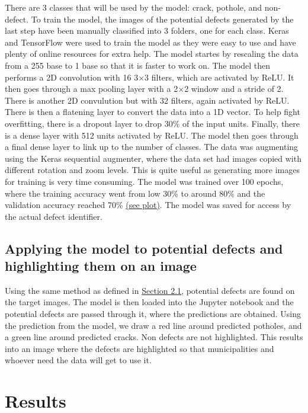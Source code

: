 \documentclass[12pt, letterpaper, twoside]{article}
\begin{document}
There are 3 classes that will be used by the model: crack, pothole, and non-defect. 
To train the model, the images of the potential defects generated by the last step have been manually classified into 3 folders, one for each class.
Keras and TensorFlow were used to train the model as they were easy to use and have plenty of online resources for extra help.
The model startes by rescaling the data from a 255 base to 1 base so that it is faster to work on.
The model then performs a 2D convolution with 16 3$\times$3 filters, which are activated by ReLU\@.
It then goes through a max pooling layer with a 2$\times$2 window and a stride of 2.
There is another 2D convulution but with 32 filters, again activated by ReLU\@.
There is then a flatening layer to convert the data into a 1D vector.
To help fight overfitting, there is a dropout layer to drop 30\% of the input units.
Finally, there is a dense layer with 512 units activated by ReLU\@.
The model then goes through a final dense layer to link up to the number of classes. 
The data was augmenting using the Keras sequential augmenter, where the data set had images copied with different rotation and zoom levels.
This is quite useful as generating more images for training is very time consuming.
The model was trained over 100 epochs, where the training accuracy went from low 30\% to around 80\%
and the validation accuracy reached 70\% \hyperref[app:model_plot]{(see plot)}.
The model was saved for access by the actual defect identifier.

\subsection{Applying the model to potential defects and highlighting them on an image}

Using the same method as defined in \hyperref[sec:meth:1]{Section 2.1}, potential defects are found on the target images.
The model is then loaded into the Jupyter notebook and the potential defects are passed through it, where the predictions are obtained.
Using the prediction from the model, we draw a red line around predicted potholes, and a green line around predicted cracks.
Non defects are not highlighted.
This results into an image where the defects are highlighted so that municipalities and whoever need the data will get to use it.

\section{Results}\label{sec:resu}
\end{document}
